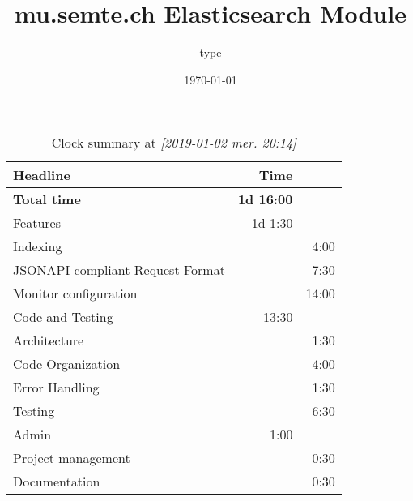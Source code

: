 \documentclass[11pt]{article}
\author{type}
\date{\today}
\title{mu.semte.ch Elasticsearch Module}
\begin{document}
\maketitle
\begin{table}[htb]
\caption{Clock summary at \textit{[2019-01-02 mer. 20:14]}}
\centering
\begin{tabular}{lrr}
Headline & Time & \\
\hline
\textbf{Total time} & \textbf{1d 16:00} & \\
\hline
Features & 1d 1:30 & \\
\hspace*{1em} Indexing &  & 4:00\\
\hspace*{1em} JSONAPI-compliant Request Format &  & 7:30\\
\hspace*{1em} Monitor configuration &  & 14:00\\
Code and Testing & 13:30 & \\
\hspace*{1em} Architecture &  & 1:30\\
\hspace*{1em} Code Organization &  & 4:00\\
\hspace*{1em} Error Handling &  & 1:30\\
\hspace*{1em} Testing &  & 6:30\\
Admin & 1:00 & \\
\hspace*{1em} Project management &  & 0:30\\
\hspace*{1em} Documentation &  & 0:30\\
\end{tabular}
\end{table}
\end{document}
